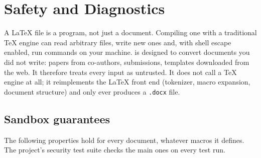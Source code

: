 \section{Safety and Diagnostics}\label{sec:security}

A \LaTeX{} file is a program, not just a document. Compiling one with a
traditional \TeX{} engine can read arbitrary files, write new ones and, with
shell escape enabled, run commands on your machine. \texdocx{} is designed to
convert documents you did not write: papers from co-authors, submissions,
templates downloaded from the web. It therefore treats every input as
untrusted. It does not call a \TeX{} engine at all; it reimplements the
\LaTeX{} front end (tokenizer, macro expansion, document structure) and only
ever produces a \texttt{.docx} file.

\subsection{Sandbox guarantees}\label{sec:security-sandbox}

The following properties hold for every document, whatever macros it defines.
The project's security test suite checks the main ones on every test run.

